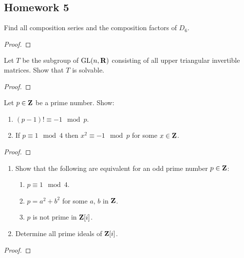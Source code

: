 \subsection{Homework 5}
\begin{problem}
  Find all composition series and the composition factors of $D_6$.
\end{problem}
\begin{proof}
\end{proof}

\begin{problem}
  Let $T$ be the subgroup of $\mathrm{GL}(n,\mathbf{R})$ consisting of all upper
  triangular invertible matrices. Show that $T$ is solvable.
\end{problem}
\begin{proof}
\end{proof}

\begin{problem}
  Let $p\in\mathbf{Z}$ be a prime number. Show:
  \begin{enumerate}[label=(\alph*),noitemsep]
  \item $(p-1)!\equiv -1\mod{p}$.
  \item If $p\equiv 1\mod{4}$ then $x^2\equiv-1\mod{p}$ for some
    $x\in\mathbf{Z}$.
  \end{enumerate}
\end{problem}
\begin{proof}
\end{proof}

\begin{problem}
  \begin{enumerate}[label=(\alph*),noitemsep]
  \item Show that the following are equivalent for an odd prime number
    $p\in\mathbf{Z}$:
    \begin{enumerate}[label=(\roman*),noitemsep]
    \item $p\equiv 1\mod 4$.
    \item $p=a^2+b^2$ for some $a$, $b$ in $\mathbf{Z}$.
    \item $p$ is not prime in $\mathbf{Z}[i]$.
    \end{enumerate}
  \item Determine all prime ideals of $\mathbf{Z}[i]$.
  \end{enumerate}
\end{problem}
\begin{proof}
\end{proof}

